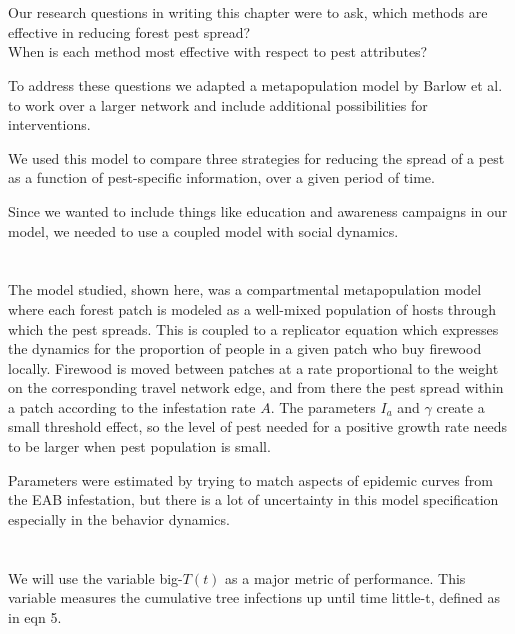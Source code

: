 \documentclass{article}
\begin{document}
\section{}

Our research questions in writing this chapter were to ask, which methods are effective in reducing forest pest spread? \\
\vspace{0.5cm}
When is each method most effective with respect to pest attributes? 

To address these questions we adapted a metapopulation model by Barlow et al. to work over a larger network and include additional possibilities for interventions.

We used this model to compare three strategies for reducing the spread of a pest as a function of pest-specific information, over a given period of time.

Since we wanted to include things like education and awareness campaigns in our model, we needed to use a coupled model with social dynamics. 

\section{}

The model studied, shown here, was a compartmental metapopulation model where each forest patch is modeled as a well-mixed population of hosts through which the pest spreads. This is coupled to a replicator equation which expresses the dynamics for the proportion of people in a given patch who buy firewood locally. Firewood is moved between patches at a rate proportional to the weight on the corresponding travel network edge, and from there the pest spread within a patch according to the infestation rate $A$. The parameters $I_a$ and $\gamma$ create a small threshold effect, so the level of pest needed for a positive growth rate needs to be larger when pest population is small. 

Parameters were estimated by trying to match aspects of epidemic curves from the EAB infestation, but there is a lot of uncertainty in this model specification especially in the behavior dynamics. 

\section{}

We will use the variable big-$T(t)$ as a major metric of performance. This variable measures the cumulative tree infections up until time little-t, defined as in eqn 5.
\end{document}
